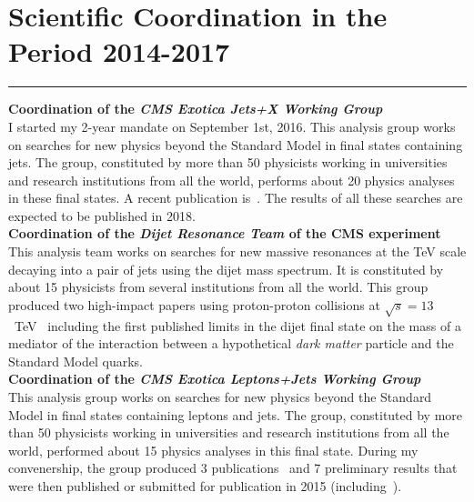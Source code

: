 \documentclass[10pt, a4paper]{article}
\newcommand{\years}[1]{\marginnote{\hskip-0.2in{\small #1}}}
\begin{document}
\section*{Scientific Coordination in the Period 2014-2017}
\vspace{-5pt}
\hrule
\vspace{10pt}
\years{09/2016 - today}\textbf{Coordination of the \emph{CMS Exotica
    Jets+X Working Group}} \\
I started my 2-year mandate on September 1st, 2016.
This analysis group works on searches for new physics beyond the
Standard Model in final states containing jets. The group, 
constituted by more than 50 physicists working in universities and
research institutions from all the world, performs
about 20 physics analyses in these final states. A recent publication
is~\cite{Sirunyan:2017nvi}. The results of all these searches are
expected to be published in 2018. \\ [1em]
\years{09/2014 - 09/2016}\textbf{Coordination of the \emph{Dijet Resonance
  Team} of the CMS experiment}\\
This analysis team works on searches for new massive resonances at the TeV
scale decaying into a pair of jets using the dijet mass spectrum. It is
constituted by about 15 physicists from several institutions from
all the world. This group produced two high-impact papers using proton-proton
collisions at $\sqrt{s}=13$~TeV~\cite{Sirunyan:2016iap,Khachatryan:2015dcf} 
including the first published limits in the dijet final state on the
mass of a mediator of the interaction between a hypothetical {\it dark
  matter} particle and the Standard Model quarks.\\[1em]
\years{01/2013 - 01/2015}\textbf{Coordination of the \emph{CMS Exotica
    Leptons+Jets Working Group}}\\
This analysis group works on searches for new physics beyond the
Standard Model in final states containing leptons and jets. The group, 
constituted by more than 50 physicists working in universities and
research institutions from all the world, performed about 15 physics
analyses in this final state. During my convenership, the group
produced 3 publications~\cite{Khachatryan:2014ura,Khachatryan:2014dka,Khachatryan:2014gha}
and 7 preliminary results that were then published or submitted for
publication in 2015 (including~\cite{Khachatryan:2016yji,Khachatryan:2015ywa,Khachatryan:2015vaa}).
\end{document}
